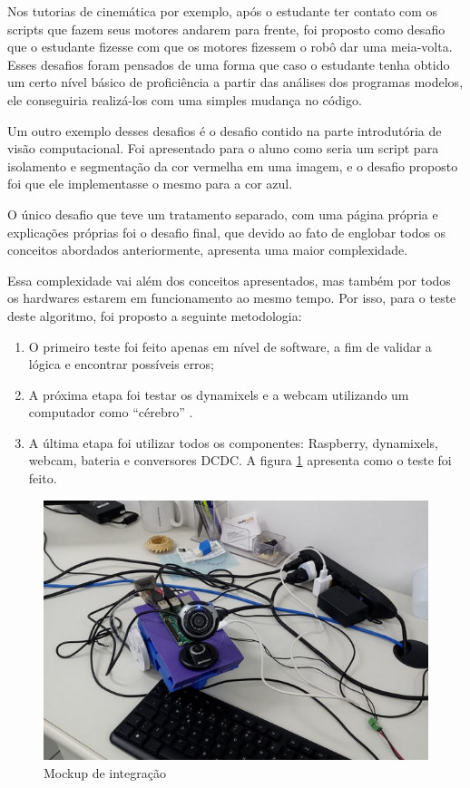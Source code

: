 Nos tutorias de cinemática por exemplo, após o estudante ter contato com os scripts que fazem seus motores andarem para frente, foi proposto como desafio que o estudante fizesse com que os motores fizessem o robô dar uma meia-volta. Esses desafios foram pensados de uma forma que caso o estudante tenha obtido um certo nível básico de proficiência a partir das análises dos programas modelos, ele conseguiria realizá-los com uma simples mudança no código.

Um outro exemplo desses desafios é o desafio contido na parte introdutória de visão computacional. Foi apresentado para o aluno como seria um script para isolamento e segmentação da cor vermelha em uma imagem, e o desafio proposto foi que ele implementasse o mesmo para a cor azul.

O único desafio que teve um tratamento separado, com uma página própria e explicações próprias foi o desafio final, que devido ao fato de englobar todos os conceitos abordados anteriormente, apresenta uma maior complexidade.

Essa complexidade vai além dos conceitos apresentados, mas também por todos os hardwares estarem em funcionamento ao mesmo tempo. Por isso, para o teste deste algoritmo, foi proposto a seguinte metodologia:

\begin{enumerate}
	\item O primeiro teste foi feito apenas em nível de software, a fim de validar a lógica e encontrar possíveis erros;
	\item A próxima etapa foi testar os dynamixels e a webcam utilizando um computador como “cérebro” .
	\item A última etapa foi utilizar todos os componentes: Raspberry, dynamixels, webcam, bateria e conversores DCDC. A figura \ref{fig:testefinal} apresenta como o teste foi feito.
\end{enumerate}

\begin{figure}[H]
	\centering
	\includegraphics[scale=0.75, angle=0]{Figures/testefinal.png}
	\caption{Mockup de integração}
	\label{fig:testefinal}
\end{figure}


